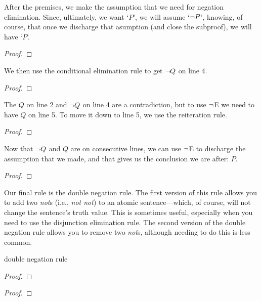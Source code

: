 After the premises, we make the assumption that we need for negation elimination. Since, ultimately, we want `$P$', we will assume `${\neg} P$', knowing, of course, that once we discharge that asumption (and close the subproof), we will have `$P$'.

\begin{proof}
	 \pr{}	
	 \pr{}
	\open
		\as{}
\end{proof}
We then use the conditional elimination rule to get ${\neg} Q$ on line 4. 
\begin{proof}
	 \pr{}	
	 \pr{}
	\open
		\as{}
\end{proof}
The $Q$ on line 2 and ${\neg} Q$ on line 4 are a contradiction, but to use ${\neg}$E we need to have $Q$ on line 5. To move it down to line 5, we use the reiteration rule. 

\begin{proof}
	 \pr{}	
	 \pr{}
	\open
		\as{}
\end{proof}
Now that ${\neg} Q$ and $Q$ are on consecutive lines, we can use ${\neg}$E to discharge the assumption that we made, and that gives us the conclusion we are after: $P$.

\begin{proof}
	 \pr{}	
	 \pr{}
	\open
		\as{}
	\close
\end{proof}

Our final rule is the double negation rule. The first version of this rule allows you to add two \textit{not}s (i.e., \textit{not not}) to an atomic sentence---which, of course, will not change the sentence's truth value. This is sometimes useful, especially when you need to use the disjunction elimination rule. The second version of the double negation rule allows you to remove two \textit{not}s, although needing to do this is less common.

\begin{factboxy}{double negation rule}
\begin{proof}
	 
\end{proof}

\begin{proof}
	 
\end{proof}
\end{factboxy}

